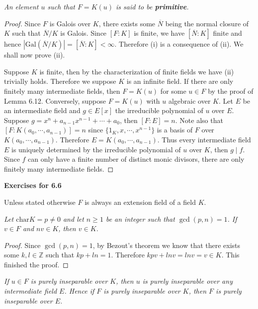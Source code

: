 \begin{note}\em
An element $u$ such that $F=K(u)$ is said to be \textbf{primitive}.
\end{note}
\begin{proof}
Since $F$ is Galois over $K$, there exists some $\overline{N}$ being the normal closure of $K$ such that $\overline{N}/K$ is Galois. Since $[F:K]$ is finite, we have $[\overline{N}:K]$ finite and hence $|\mathrm{Gal}(\overline{N}/K)|=[\overline{N}:K]<\infty$. Therefore (i) is a consequence of (ii). We shall now prove (ii).\par
Suppose $K$ is finite, then by the characterization of finite fields we have (ii) trivially holds. Therefore we suppose $K$ is an infinite field. If there are only finitely many intermediate fields, then $F=K(u)$ for some $u\in F$ by the proof of Lemma 6.12. Conversely, suppose $F=K(u)$ with $u$ algebraic over $K$. Let $E$ be an intermediate field and $g\in E[x]$ the irreducible polynomial of $u$ over $E$. Suppose $g=x^n+a_{n-1}x^{n-1}+\cdots+a_0$, then $[F:E]=n$. Note also that $[F:K(a_0,\cdots,a_{n-1})]=n$ since $\{1_K,x,\cdots,x^{n-1}\}$ is a basis of $F$ over $K(a_0,\cdots,a_{n-1})$. Therefore $E=K(a_0,\cdots,a_{n-1})$. Thus every intermediate field $E$ is uniquely determined by the irreducible polynomial of $u$ over $K$, then $g\mid f$. Since $f$ can only have a finite number of distinct monic divisors, there are only finitely many intermediate fields.
\end{proof}
\begin{center}
\begin{large}
    \textbf{Exercises for 6.6}
\end{large}
\end{center}
Unless stated otherwise $F$ is always an extension field of a field $K$.
\begin{problem}\em
Let $\mathrm{char}K=p\neq 0$ and let $n\geq 1$ be an integer such that $\gcd{(p, n)}=1$. If $v\in F$ and $nv\in K$, then $v\in K$.
\end{problem}
\begin{proof}
Since $\gcd{(p,n)}=1$, by Bezout's theorem we know that there exists some $k,l\in\mathbb{Z}$ such that $kp+ln=1$. Therefore $kpv+lnv=lnv=v\in K$. This finished the proof.
\end{proof}
\begin{problem}\em
If $u\in F$ is purely inseparable over $K$, then $u$ is purely inseparable over any intermediate field $E$. Hence if $F$ is purely inseparable over $K$, then $F$ is purely inseparable over $E$.
\end{problem}
